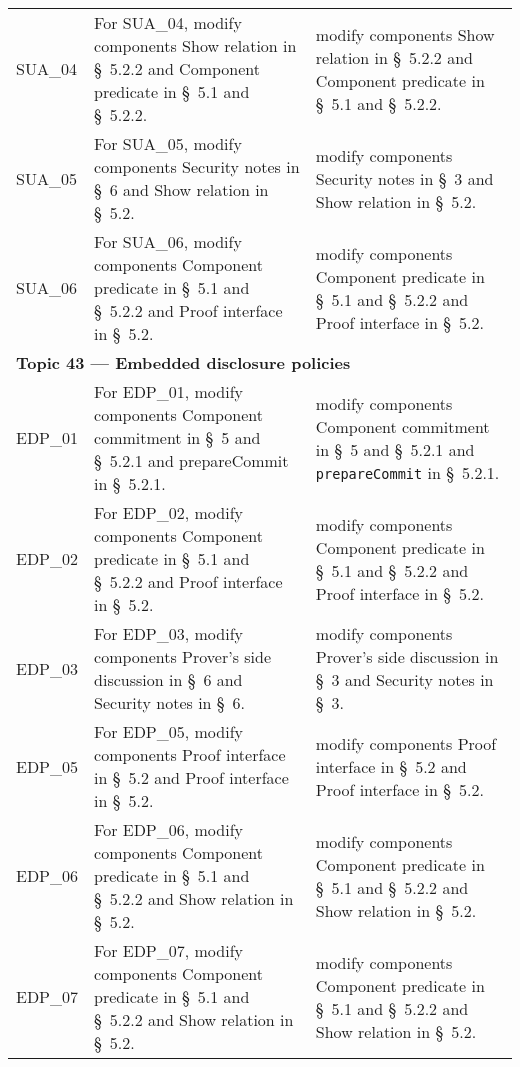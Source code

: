 \begin{landscape}
\begin{longtable}{p{3cm} p{10cm} p{7cm}}
SUA\_04 &
For SUA\_04, modify components Show relation in \S~5.2.2 and Component predicate in \S~5.1 and \S~5.2.2. &
modify components Show relation in \S~5.2.2 and Component predicate in \S~5.1 and \S~5.2.2. \\

SUA\_05 &
For SUA\_05, modify components Security notes in \S~6 and Show relation in \S~5.2. &
modify components Security notes in \S~3 and Show relation in \S~5.2. \\

SUA\_06 &
For SUA\_06, modify components Component predicate in \S~5.1 and \S~5.2.2 and Proof interface in \S~5.2. &
modify components Component predicate in \S~5.1 and \S~5.2.2 and Proof interface in \S~5.2. \\[1em]


\multicolumn{3}{l}{\textbf{Topic 43 — Embedded disclosure policies}}\\

EDP\_01 &
For EDP\_01, modify components Component commitment in \S~5 and \S~5.2.1 and prepareCommit in \S~5.2.1. &
modify components Component commitment in \S~5 and \S~5.2.1 and \texttt{prepareCommit} in \S~5.2.1. \\

EDP\_02 &
For EDP\_02, modify components Component predicate in \S~5.1 and \S~5.2.2 and Proof interface in \S~5.2. &
modify components Component predicate in \S~5.1 and \S~5.2.2 and Proof interface in \S~5.2. \\

EDP\_03 &
For EDP\_03, modify components Prover's side discussion in \S~6 and Security notes in \S~6. &
modify components Prover's side discussion in \S~3 and Security notes in \S~3. \\

EDP\_05 &
For EDP\_05, modify components Proof interface in \S~5.2 and Proof interface in \S~5.2. &
modify components Proof interface in \S~5.2 and Proof interface in \S~5.2. \\

EDP\_06 &
For EDP\_06, modify components Component predicate in \S~5.1 and \S~5.2.2 and Show relation in \S~5.2. &
modify components Component predicate in \S~5.1 and \S~5.2.2 and Show relation in \S~5.2. \\

EDP\_07 &
For EDP\_07, modify components Component predicate in \S~5.1 and \S~5.2.2 and Show relation in \S~5.2. &
modify components Component predicate in \S~5.1 and \S~5.2.2 and Show relation in \S~5.2. \\


\end{longtable}
\end{landscape}
